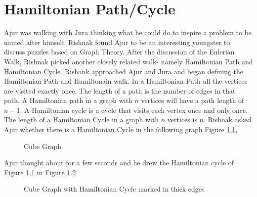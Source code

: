 \chapter{Hamiltonian Path/Cycle}
Ajur was walking with Jura thinking what he could do to inspire a problem to be named after himself. Rishnak found Ajur to be an interesting youngster to discuss puzzles based on Graph Theory. After the discussion of the Eulerian Walk, Rishnak picked another closely related walk- namely Hamiltonian Path and Hamiltonian Cycle. Rishank approached Ajur and Jura and began defining the Hamiltonian Path and Hamiltonain walk.
In a Hamiltonian Path all the vertices are visited exactly once. 
The length of a path is the number of edges in that path. A Hamiltonian path in a graph with $n$ vertices will have a path length of $n-1$. A Hamiltonian cycle is a cycle that visits each vertex once and only once. The length of a Hamiltonian Cycle in a graph with $n$ vertices is $n$. Rishnak asked Ajur whether there is a Hamiltonian Cycle in the following graph Figure \ref{5g1},
\begin{figure}
\begin{center}
\caption{ Cube Graph }\label{5g1}
\end{center}
\end{figure}

Ajur thought about for a few seconds and he drew the Hamiltonian cycle of Figure \ref{5g1} in Figure \ref {5g2}

\begin{figure}
\begin{center}
\caption{ Cube Graph with Hamiltonian  Cycle marked in thick edges}\label{5g2}
\end{center}
\end{figure}

